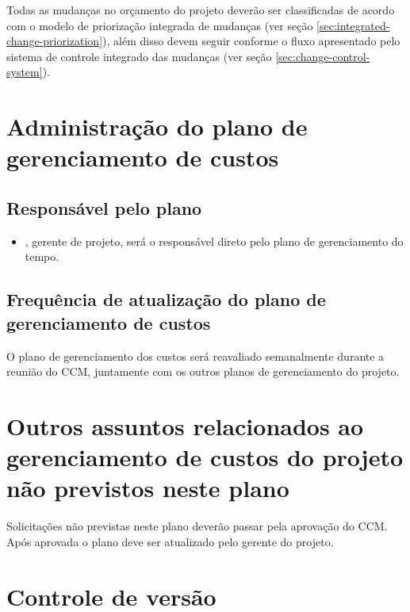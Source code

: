 Todas as mudanças no orçamento do projeto deverão ser classificadas de acordo com o modelo de priorização integrada de mudanças (ver seção \ref{sec:integrated-change-priorization}), além disso devem seguir conforme o fluxo apresentado pelo sistema de controle integrado das mudanças (ver seção \ref{sec:change-control-system}).

\section{Administração do plano de gerenciamento de custos}

\subsection{Responsável pelo plano}

\begin{itemize}
	\item \projectManagerName{}, gerente de projeto, será o responsável direto pelo plano de gerenciamento do tempo.
\end{itemize}

\subsection{Frequência de atualização do plano de gerenciamento de custos}

O plano de gerenciamento dos custos será reavaliado semanalmente durante a reunião do CCM, juntamente com os outros planos de gerenciamento do projeto.

\section{Outros assuntos relacionados ao gerenciamento de custos do projeto não previstos neste plano}

Solicitações não previstas neste plano deverão passar pela aprovação do CCM. Após aprovada o plano deve ser atualizado pelo gerente do projeto.

\section{Controle de versão}

